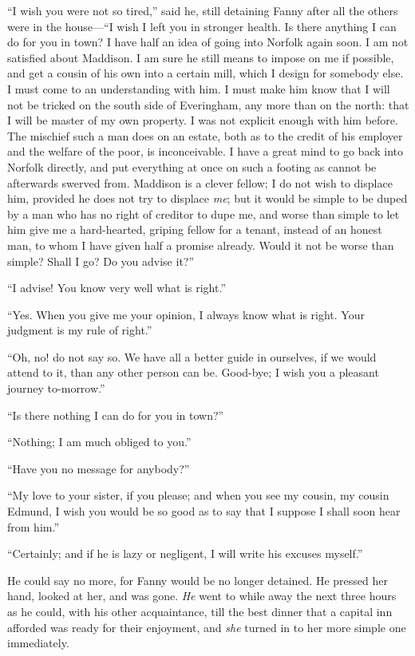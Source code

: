 ``I wish you were not so tired,'' said he, still detaining
Fanny after all the others were in the house---``I wish I
left you in stronger health.  Is there anything I can
do for you in town?  I have half an idea of going into
Norfolk again soon.  I am not satisfied about Maddison.
I am sure he still means to impose on me if possible,
and get a cousin of his own into a certain mill, which I
design for somebody else.  I must come to an understanding
with him.  I must make him know that I will not be
tricked on the south side of Everingham, any more than on
the north:  that I will be master of my own property.
I was not explicit enough with him before.  The mischief
such a man does on an estate, both as to the credit of his
employer and the welfare of the poor, is inconceivable.
I have a great mind to go back into Norfolk directly,
and put everything at once on such a footing as cannot
be afterwards swerved from.  Maddison is a clever fellow;
I do not wish to displace him, provided he does not try
to displace \emph{me}; but it would be simple to be duped
by a man who has no right of creditor to dupe me,
and worse than simple to let him give me a hard-hearted,
griping fellow for a tenant, instead of an honest man,
to whom I have given half a promise already.  Would it not
be worse than simple?  Shall I go?  Do you advise it?''

``I advise!  You know very well what is right.''

``Yes.  When you give me your opinion, I always know
what is right.  Your judgment is my rule of right.''

``Oh, no! do not say so.  We have all a better guide
in ourselves, if we would attend to it, than any other person
can be.  Good-bye; I wish you a pleasant journey to-morrow.''

``Is there nothing I can do for you in town?''

``Nothing; I am much obliged to you.''

``Have you no message for anybody?''

``My love to your sister, if you please; and when you see
my cousin, my cousin Edmund, I wish you would be so good
as to say that I suppose I shall soon hear from him.''

``Certainly; and if he is lazy or negligent, I will write
his excuses myself.''

He could say no more, for Fanny would be no longer detained.
He pressed her hand, looked at her, and was gone.
\emph{He} went to while away the next three hours as he could,
with his other acquaintance, till the best dinner that
a capital inn afforded was ready for their enjoyment,
and \emph{she} turned in to her more simple one immediately.


